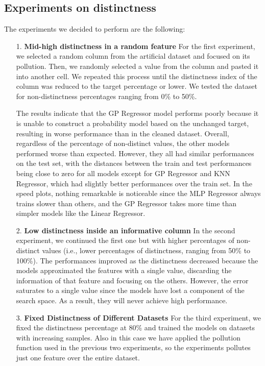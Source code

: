 \documentclass{Configuration_Files/PoliMi3i_thesis}
\begin{document}
\subsection{Experiments on distinctness}
\label{subsec:section_2_2_2}%
The experiments we decided to perform are the following:
\begin{enumerate}
\item[1.] \textbf{Mid-high distinctness in a random feature}
For the first experiment, we selected a random column from the artificial dataset and focused on its pollution. Then, we randomly selected a value from the column and pasted it into another cell. We repeated this process until the distinctness index of the column was reduced to the target percentage or lower. We tested the dataset for non-distinctness percentages ranging from 0\% to 50\%.

The results indicate that the GP Regressor model performs poorly because it is unable to construct a probability model based on the unchanged target, resulting in worse performance than in the cleaned dataset. Overall, regardless of the percentage of non-distinct values, the other models performed worse than expected. However, they all had similar performances on the test set, with the distances between the train and test performances being close to zero for all models except for GP Regressor and KNN Regressor, which had slightly better performances over the train set. In the speed plots, nothing remarkable is noticeable since the MLP Regressor always trains slower than others, and the GP Regressor takes more time than simpler models like the Linear Regressor.

\item[2.] \textbf{Low distinctness inside an informative column}
In the second experiment, we continued the first one but with higher percentages of non-distinct values (i.e., lower percentages of distinctness, ranging from 50\% to 100\%). The performances improved as the distinctness decreased because the models approximated the features with a single value, discarding the information of that feature and focusing on the others. However, the error saturates to a single value since the models have lost a component of the search space. As a result, they will never achieve high performance.

\item[3.] \textbf{Fixed Distinctness of Different Datasets}
For the third experiment, we fixed the distinctness percentage at 80\% and trained the models on datasets with increasing samples. Also in this case we have applied the pollution function used in the previous two experiments, so the experiments pollutes just one feature over the entire dataset.


\end{enumerate}
\end{document}
